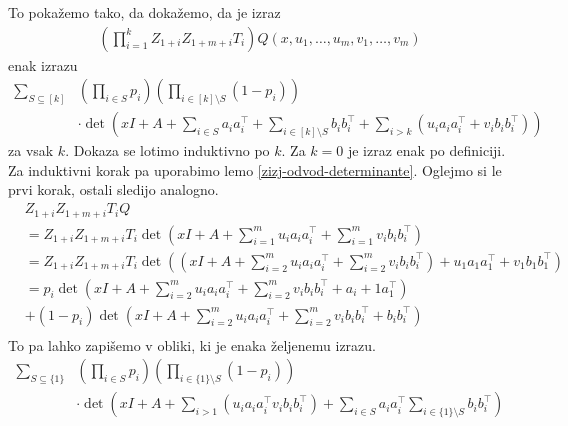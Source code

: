 \begin{dokaz}
    To pokažemo tako, da dokažemo, da je izraz
    \begin{align*}
        \left(\prod_{i=1}^k Z_{1+i}Z_{1+m+i}T_i\right)Q(x, u_1, \ldots, u_m, v_1, \ldots, v_m)
    \end{align*}
    enak izrazu
    \begin{align*}
        \sum_{S\subseteq [k]} & \left(\prod_{i\in S} p_i\right)\left(\prod_{i\in [k]\setminus S} \left(1-p_i\right)\right)                                                                         \\
                              & \cdot\det\left(xI + A + \sum_{i\in S} a_i a_i^\top + \sum_{i\in [k]\setminus S} b_i b_i^\top + \sum_{i>k} \left( u_i a_i a_i^\top + v_i b_i b_i^\top\right)\right)
    \end{align*}
    za vsak \(k\). Dokaza se lotimo induktivno po \(k\). Za \(k=0\) je izraz enak po definiciji. Za induktivni korak pa uporabimo lemo \ref{zizj-odvod-determinante}. Oglejmo si le prvi korak, ostali sledijo analogno.
    \begin{align*}
         & Z_{1+i} Z_{1+m+i} T_i Q                                                                                                                                           \\
         & =Z_{1+i} Z_{1+m+i} T_i \det\left(xI + A + \sum_{i=1}^m u_i a_i a_i^\top + \sum_{i=1}^m v_i b_i b_i^\top\right)                                                    \\
         & =Z_{1+i} Z_{1+m+i} T_i \det\left(\left(xI + A + \sum_{i=2}^m u_i a_i a_i^\top + \sum_{i=2}^m v_i b_i b_i^\top\right) + u_1 a_1 a_1^\top + v_1 b_1 b_1^\top\right) \\
         & = p_i \det\left(xI + A + \sum_{i=2}^m u_i a_i a_i^\top + \sum_{i=2}^m v_i b_i b_i^\top + a_i+1 a_1^\top\right)                                                    \\
         & + (1-p_i) \det\left(xI + A + \sum_{i=2}^m u_i a_i a_i^\top + \sum_{i=2}^m v_i b_i b_i^\top + b_i b_i^\top\right)                                                  \\
    \end{align*}
    To pa lahko zapišemo v obliki, ki je enaka željenemu izrazu.
    \begin{align*}
        \sum_{S\subseteq \{1\}} & \left(\prod_{i\in S} p_i\right)\left(\prod_{i\in \{1\}\setminus S} \left(1-p_i\right)\right)                                                          \\
                                & \cdot \det\left(xI + A + \sum_{i > 1} (u_i a_i a_i^\top v_i b_i b_i^\top) + \sum_{i\in S}a_ia_i^\top \sum_{i\in \{1\}\setminus S} b_i b_i^\top\right)

\end{align*}
\end{dokaz}
